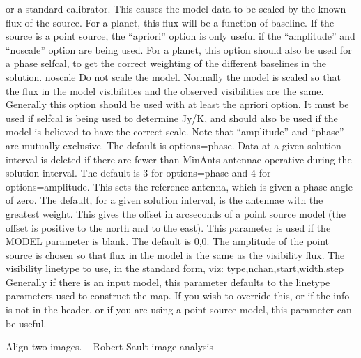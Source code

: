 {{                 or a standard calibrator. This causes the model data to
                 be scaled by the known flux of the source. For a planet,
                 this flux will be a function of baseline. If the
                 source is a point source, the ``apriori'' option is only
                 useful if the ``amplitude'' and ``noscale'' option are
                 being used. For a planet, this option should also be
                 used for a phase selfcal, to get the correct weighting
                 of the different baselines in the solution.
   noscale       Do not scale the model. Normally the model is scaled
                 so that the flux in the model visibilities and the
                 observed visibilities are the same. Generally this
                 option should be used with at least the apriori option.
                 It must be used if selfcal is being used to determine
                 Jy/K, and should also be used if the model is believed
                 to have the correct scale.
\endtt}
Note that ``amplitude'' and ``phase'' are mutually exclusive.
The default is options=phase.
Data at a given solution interval is deleted  if there are fewer than
MinAnts antennae operative during the solution interval. The default
is 3 for options=phase and 4 for options=amplitude.
This sets the reference antenna, which is given a phase angle of zero.
The default, for a given solution interval, is the antennae with the
greatest weight.
This gives the offset in arcseconds of a point source model (the
offset is positive to the north and to the east). This parameter is
used if the MODEL parameter is blank. The default is 0,0. The
amplitude of the point source is chosen so that flux in the model
is the same as the visibility flux.
The visibility linetype to use, in the standard form, viz:
{\eightpoint\begintt
  type,nchan,start,width,step
\endtt}
Generally if there is an input model, this parameter defaults to the
linetype parameters used to construct the map. If you wish to override
this, or if the info is not in the header, or if you are using
a point source model, this parameter can be useful.
\par}
%
\noindent Align two images.
\newline \ 
\newline {} Robert Sault
\newline {} image analysis
